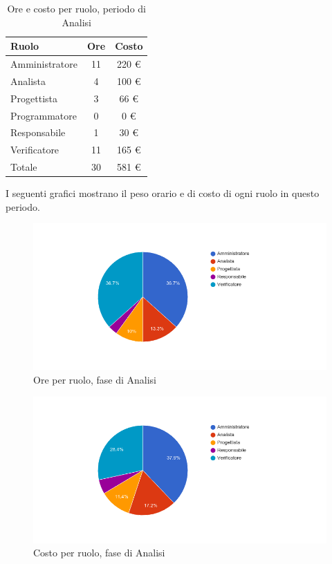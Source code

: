 \begin{table}[H]
	\centering
	\begin{tabular}{ l c c }
		\textbf{Ruolo} & \textbf{Ore} & \textbf{Costo} \\
		\hline
		Amministratore & 11 & 220 \euro{} \\
		Analista & 4 & 100 \euro{} \\
		Progettista & 3 & 66 \euro{} \\
		Programmatore & 0 & 0 \euro{} \\
		Responsabile & 1 & 30 \euro{} \\
		Verificatore & 11 & 165 \euro{} \\
		\hline
		Totale & 30 & 581 \euro{} \\
		\hline
	\end{tabular}
	\caption{Ore e costo per ruolo, periodo di Analisi}
\end{table}

I seguenti grafici mostrano il peso orario e di costo di ogni ruolo in questo periodo.

\begin{figure}[H]
  \begin{center}
    \includegraphics[width=15cm]{res/img/prospettoEconomico/orePerRuoloAnalisiMiglioramenti.png}
  \caption{Ore per ruolo, fase di Analisi}
  \end{center} 
\end{figure}  

\begin{figure}[H]
  \begin{center}
    \includegraphics[width=15cm]{res/img/prospettoEconomico/costoPerRuoloAnalisiMiglioramenti.png}
  \caption{Costo per ruolo, fase di Analisi}
  \end{center} 
\end{figure}  


